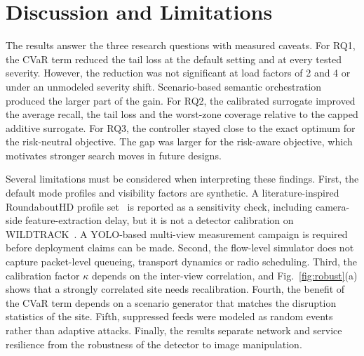 \documentclass[letterpaper,journal]{IEEEtran}
\begin{document}


\section{Discussion and Limitations}
The results answer the three research questions with measured caveats. For RQ1, the CVaR term reduced the tail loss at the default setting and at every tested severity. However, the reduction was not significant at load factors of 2 and 4 or under an unmodeled severity shift. Scenario-based semantic orchestration produced the larger part of the gain. For RQ2, the calibrated surrogate improved the average recall, the tail loss and the worst-zone coverage relative to the capped additive surrogate. For RQ3, the controller stayed close to the exact optimum for the risk-neutral objective. The gap was larger for the risk-aware objective, which motivates stronger search moves in future designs.

Several limitations must be considered when interpreting these findings. First, the default mode profiles and visibility factors are synthetic. A literature-inspired RoundaboutHD profile set~\cite{lin2025easemcvt} is reported as a sensitivity check, including camera-side feature-extraction delay, but it is not a detector calibration on WILDTRACK~\cite{chavdarova2018wildtrack}. A YOLO-based multi-view measurement campaign is required before deployment claims can be made. Second, the flow-level simulator does not capture packet-level queueing, transport dynamics or radio scheduling. Third, the calibration factor $\kappa$ depends on the inter-view correlation, and Fig.~\ref{fig:robust}(a) shows that a strongly correlated site needs recalibration. Fourth, the benefit of the CVaR term depends on a scenario generator that matches the disruption statistics of the site. Fifth, suppressed feeds were modeled as random events rather than adaptive attacks. Finally, the results separate network and service resilience from the robustness of the detector to image manipulation.
\end{document}

